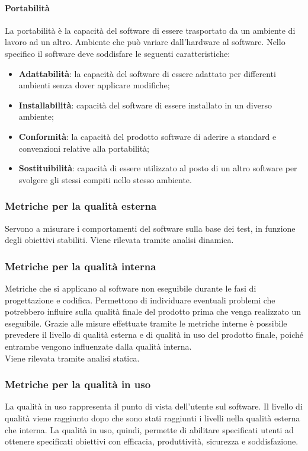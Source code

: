 \paragraph{Portabilità}
La portabilità è la capacità del software di essere trasportato da un ambiente di lavoro ad un altro. Ambiente che può variare dall'hardware al software.
Nello specifico il software deve soddisfare le seguenti caratteristiche:
\begin{itemize}
	\item \textbf{Adattabilità}: la capacità del software di essere adattato per differenti ambienti senza dover applicare modifiche;
	\item \textbf{Installabilità}: capacità del software di essere installato in un diverso ambiente;
	\item \textbf{Conformità}: la capacità del prodotto software di aderire a standard e convenzioni relative alla portabilità;
	\item \textbf{Sostituibilità}: capacità di essere utilizzato al posto di un altro software per svolgere gli stessi compiti nello stesso ambiente.
\end{itemize}
\subsubsection{Metriche per la qualità esterna}
Servono a misurare i comportamenti del software sulla base dei test, in funzione degli obiettivi stabiliti. Viene rilevata tramite analisi dinamica.

\subsubsection{Metriche per la qualità interna}
Metriche che si applicano al software non eseguibile durante le fasi di progettazione e codifica. Permettono di individuare eventuali problemi che potrebbero influire sulla qualità finale del prodotto prima che venga realizzato un eseguibile. Grazie alle misure effettuate tramite le metriche interne è possibile prevedere il livello di qualità esterna e di qualità in uso del prodotto finale, poiché entrambe vengono influenzate dalla qualità interna.\\
Viene rilevata tramite analisi statica.

\subsubsection{Metriche per la qualità in uso}
La qualità in uso rappresenta il punto di vista dell'utente sul software. Il livello di qualità viene raggiunto dopo che sono stati raggiunti i livelli nella qualità esterna che interna. La qualità in uso, quindi, permette di abilitare specificati utenti ad ottenere specificati obiettivi con efficacia, produttività, sicurezza e soddisfazione.


